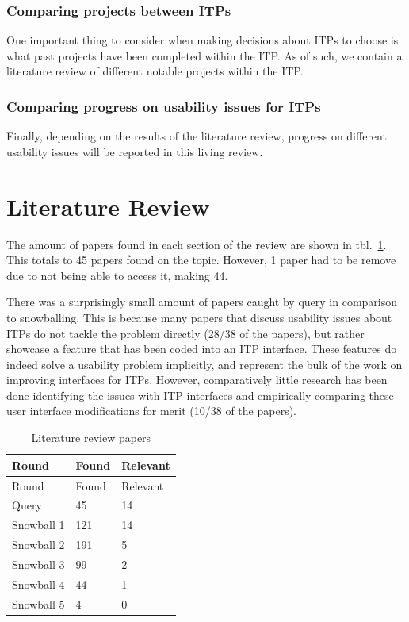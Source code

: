 \documentclass[
]{article}
\begin{document}
\hypertarget{comparing-projects-between-itps}{%
\subsubsection{Comparing projects between
ITPs}\label{comparing-projects-between-itps}}

One important thing to consider when making decisions about ITPs to
choose is what past projects have been completed within the ITP. As of
such, we contain a literature review of different notable projects
within the ITP.

\hypertarget{comparing-progress-on-usability-issues-for-itps}{%
\subsubsection{Comparing progress on usability issues for
ITPs}\label{comparing-progress-on-usability-issues-for-itps}}

Finally, depending on the results of the literature review, progress on
different usability issues will be reported in this living review.

\hypertarget{literature-review}{%
\section{Literature Review}\label{literature-review}}

The amount of papers found in each section of the review are shown in
tbl.~\ref{tbl:litresults}. This totals to 45 papers found on the topic.
However, 1 paper had to be remove due to not being able to access it,
making 44.

There was a surprisingly small amount of papers caught by query in
comparison to snowballing. This is because many papers that discuss
usability issues about ITPs do not tackle the problem directly (28/38 of
the papers), but rather showcase a feature that has been coded into an
ITP interface. These features do indeed solve a usability problem
implicitly, and represent the bulk of the work on improving interfaces
for ITPs. However, comparatively little research has been done
identifying the issues with ITP interfaces and empirically comparing
these user interface modifications for merit (10/38 of the papers).

\hypertarget{tbl:litresults}{}
\begin{longtable}[]{@{}lll@{}}
\caption{\label{tbl:litresults}Literature review papers}\tabularnewline
\toprule
Round & Found & Relevant \\
\midrule
\endfirsthead
\toprule
Round & Found & Relevant \\
\midrule
\endhead
Query & 45 & 14 \\
Snowball 1 & 121 & 14 \\
Snowball 2 & 191 & 5 \\
Snowball 3 & 99 & 2 \\
Snowball 4 & 44 & 1 \\
Snowball 5 & 4 & 0 \\
\bottomrule
\end{longtable}
\end{document}
